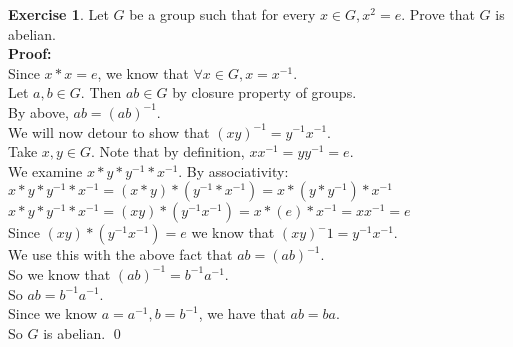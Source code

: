 \documentclass[12pt]{article}
\theoremstyle{definition}
\newtheorem{exercise}[theorem]{Exercise}
\newcommand{\V}{\vspace{0.3cm}\\}
\newcommand{\pro}{\V \textbf{Proof:} \V}
\begin{document}
\begin{exercise} Let $G$ be a group such that for every $x \in G, x^2 = e$. Prove that $G$ is abelian.\pro
Since $x*x = e$, we know that $\forall x \in G, x=x^{-1}$. \V
Let $a,b \in G$. Then $ab \in G$ by closure property of groups. \\
By above, $ab = (ab)^{-1}$.\V
We will now detour to show that $(xy)^{-1} = y^{-1}x^{-1}$.\\
Take $x,y \in G$. Note that by definition, $xx^{-1} = yy^{-1} = e$. \\
We examine $x*y*y^{-1}*x^{-1}$. By associativity:\\ $x*y*y^{-1}*x^{-1} = (x*y)*(y^{-1}*x^{-1}) =  x*(y*y^{-1})*x^{-1}$\\
$x*y*y^{-1}*x^{-1} = (xy)*(y^{-1}x^{-1}) = x*(e)*x^{-1} = xx^{-1} = e$\\
Since $(xy)*(y^{-1}x^{-1})=e$ we know that $(xy)^-1 = y^{-1}x^{-1}$. \V
We use this with the above fact that $ab = (ab)^{-1}$.\\
So we know that $(ab)^{-1} = b^{-1}a^{-1}$. \\
So $ab = b^{-1}a^{-1}$.\\
Since we know $a = a^{-1}, b=b^{-1}$, we have that $ab = ba$. \\
So $G$ is abelian. \qed

\end{exercise}
\end{document}
